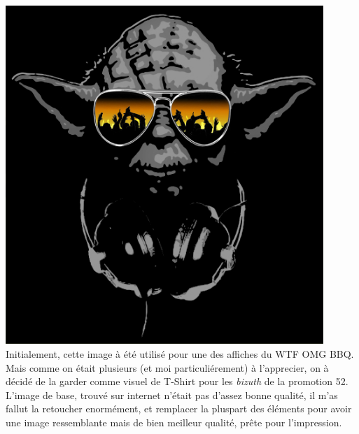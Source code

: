        \begin{center}
            \centering
            \includegraphics[width=0.9\textwidth]{img/yoda-or.jpg}\\
            Initialement, cette image à été utilisé pour une des affiches du WTF OMG BBQ.
            Mais comme on était plusieurs (et moi particuliérement) à l'apprecier, on à décidé de la garder comme visuel de T-Shirt pour les \emph{bizuth} de la promotion 52.
            L'image de base, trouvé sur internet n'était pas d'assez bonne qualité, il m'as fallut la retoucher enormément, et remplacer la pluspart des éléments pour avoir une image ressemblante mais de bien meilleur qualité, prête pour l'impression.
        \end{center}




